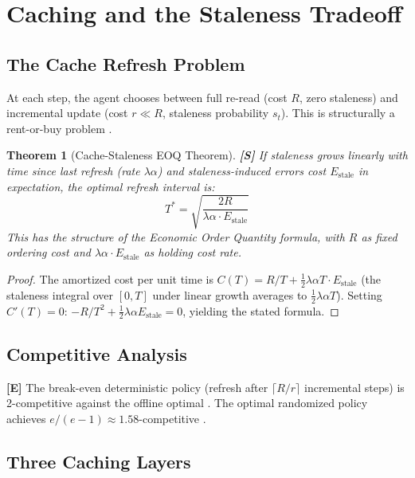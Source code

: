 \documentclass[11pt, a4paper, logo, copyright]{googledeepmind}
\newtheorem{theorem}{Theorem}[section]
\begin{document}
\section{Caching and the Staleness Tradeoff}\label{sec:caching}

\subsection{The Cache Refresh Problem}

At each step, the agent chooses between full re-read (cost $R$, zero staleness) and incremental update (cost $r \ll R$, staleness probability $s_t$). This is structurally a rent-or-buy problem \citep{sleator1985amortized}.

\begin{theorem}[Cache-Staleness EOQ Theorem]\label{thm:cache-eoq}
\textbf{[S]} If staleness grows linearly with time since last refresh (rate $\lambda\alpha$) and staleness-induced errors cost $E_{\mathrm{stale}}$ in expectation, the optimal refresh interval is:
\[
    T^* = \sqrt{\frac{2R}{\lambda\alpha \cdot E_{\mathrm{stale}}}}
\]
This has the structure of the Economic Order Quantity formula, with $R$ as fixed ordering cost and $\lambda\alpha \cdot E_{\mathrm{stale}}$ as holding cost rate.
\end{theorem}

\begin{proof}
The amortized cost per unit time is $C(T) = R/T + \frac{1}{2}\lambda\alpha T \cdot E_{\mathrm{stale}}$ (the staleness integral over $[0, T]$ under linear growth averages to $\frac{1}{2}\lambda\alpha T$). Setting $C'(T) = 0$: $-R/T^2 + \frac{1}{2}\lambda\alpha E_{\mathrm{stale}} = 0$, yielding the stated formula.
\end{proof}

\subsection{Competitive Analysis}

\textbf{[E]} The break-even deterministic policy (refresh after $\lceil R/r \rceil$ incremental steps) is 2-competitive against the offline optimal \citep{sleator1985amortized}. The optimal randomized policy achieves $e/(e-1) \approx 1.58$-competitive \citep{fiat1991competitive}.

\subsection{Three Caching Layers}
\end{document}
